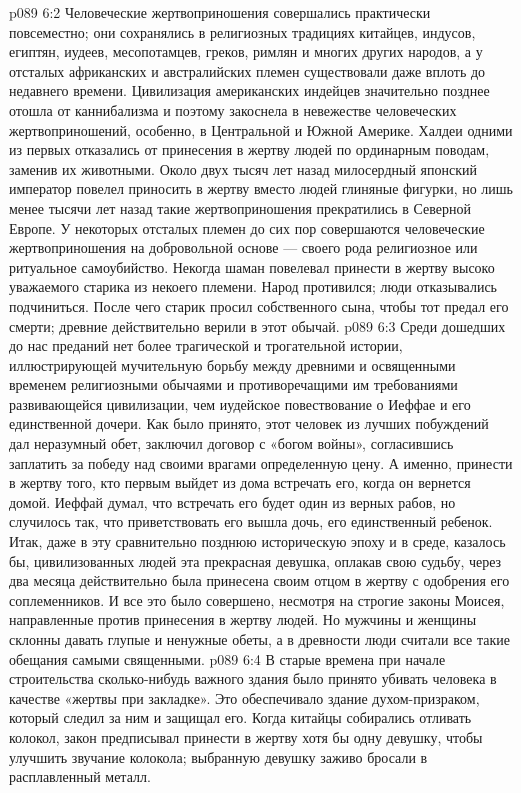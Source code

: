 \vs p089 6:2 Человеческие жертвоприношения совершались практически повсеместно; они сохранялись в религиозных традициях китайцев, индусов, египтян, иудеев, месопотамцев, греков, римлян и многих других народов, а у отсталых африканских и австралийских племен существовали даже вплоть до недавнего времени. Цивилизация американских индейцев значительно позднее отошла от каннибализма и поэтому закоснела в невежестве человеческих жертвоприношений, особенно, в Центральной и Южной Америке. Халдеи одними из первых отказались от принесения в жертву людей по ординарным поводам, заменив их животными. Около двух тысяч лет назад милосердный японский император повелел приносить в жертву вместо людей глиняные фигурки, но лишь менее тысячи лет назад такие жертвоприношения прекратились в Северной Европе. У некоторых отсталых племен до сих пор совершаются человеческие жертвоприношения на добровольной основе --- своего рода религиозное или ритуальное самоубийство. Некогда шаман повелевал принести в жертву высоко уважаемого старика из некоего племени. Народ противился; люди отказывались подчиниться. После чего старик просил собственного сына, чтобы тот предал его смерти; древние действительно верили в этот обычай.
\vs p089 6:3 \pc Среди дошедших до нас преданий нет более трагической и трогательной истории, иллюстрирующей мучительную борьбу между древними и освященными временем религиозными обычаями и противоречащими им требованиями развивающейся цивилизации, чем иудейское повествование о Иеффае и его единственной дочери. Как было принято, этот человек из лучших побуждений дал неразумный обет, заключил договор с «богом войны», согласившись заплатить за победу над своими врагами определенную цену. А именно, принести в жертву того, кто первым выйдет из дома встречать его, когда он вернется домой. Иеффай думал, что встречать его будет один из верных рабов, но случилось так, что приветствовать его вышла дочь, его единственный ребенок. Итак, даже в эту сравнительно позднюю историческую эпоху и в среде, казалось бы, цивилизованных людей эта прекрасная девушка, оплакав свою судьбу, через два месяца действительно была принесена своим отцом в жертву с одобрения его соплеменников. И все это было совершено, несмотря на строгие законы Моисея, направленные против принесения в жертву людей. Но мужчины и женщины склонны давать глупые и ненужные обеты, а в древности люди считали все такие обещания самыми священными.
\vs p089 6:4 \pc В старые времена при начале строительства сколько\hyp{}нибудь важного здания было принято убивать человека в качестве «жертвы при закладке». Это обеспечивало здание духом\hyp{}призраком, который следил за ним и защищал его. Когда китайцы собирались отливать колокол, закон предписывал принести в жертву хотя бы одну девушку, чтобы улучшить звучание колокола; выбранную девушку заживо бросали в расплавленный металл.
